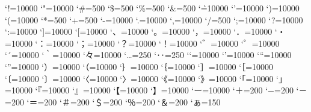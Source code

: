 \prebreakpenalty`!=10000
\prebreakpenalty`"=10000
\postbreakpenalty`\#=500
\postbreakpenalty`\$=500
\postbreakpenalty`\%=500
\postbreakpenalty`\&=500
\postbreakpenalty`\`=10000
\prebreakpenalty`'=10000
\prebreakpenalty`)=10000
\postbreakpenalty`(=10000
\prebreakpenalty`*=500
\prebreakpenalty`+=500
\prebreakpenalty`-=10000
\prebreakpenalty`.=10000
\prebreakpenalty`,=10000
\prebreakpenalty`/=500
\prebreakpenalty`;=10000
\prebreakpenalty`?=10000
\prebreakpenalty`:=10000
\prebreakpenalty`]=10000
\postbreakpenalty`[=10000
\prebreakpenalty`、=10000
\prebreakpenalty`。=10000
\prebreakpenalty`，=10000
\prebreakpenalty`．=10000
\prebreakpenalty`・=10000
\prebreakpenalty`：=10000
\prebreakpenalty`；=10000
\prebreakpenalty`？=10000
\prebreakpenalty`！=10000
\prebreakpenalty`゛=10000%
\prebreakpenalty`゜=10000%
\prebreakpenalty`´=10000%
\postbreakpenalty`｀=10000%
\prebreakpenalty`々=10000%
\prebreakpenalty`…=250%
\prebreakpenalty`‥=250%
\postbreakpenalty`‘=10000%
\prebreakpenalty`’=10000%
\postbreakpenalty`“=10000%
\prebreakpenalty`”=10000%
\prebreakpenalty`）=10000
\postbreakpenalty`（=10000
\prebreakpenalty`｝=10000
\postbreakpenalty`｛=10000
\prebreakpenalty`］=10000
\postbreakpenalty`［=10000
\postbreakpenalty`〔=10000%
\prebreakpenalty`〕=10000%
\postbreakpenalty`〈=10000%
\prebreakpenalty`〉=10000%
\postbreakpenalty`《=10000%
\prebreakpenalty`》=10000%
\postbreakpenalty`「=10000%
\prebreakpenalty`」=10000%
\postbreakpenalty`『=10000%
\prebreakpenalty`』=10000%
\postbreakpenalty`【=10000%
\prebreakpenalty`】=10000%
\prebreakpenalty`ー=10000
\prebreakpenalty`＋=200
\prebreakpenalty`−=200%
\prebreakpenalty`－=200%
\prebreakpenalty`＝=200
\postbreakpenalty`＃=200
\postbreakpenalty`＄=200
\postbreakpenalty`％=200
\postbreakpenalty`＆=200
\prebreakpenalty`ぁ=150
